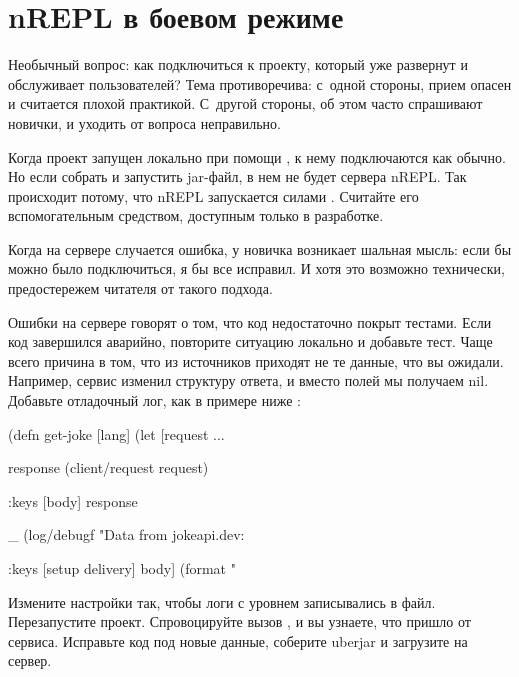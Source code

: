 \section{nREPL в боевом режиме}


Необычный вопрос: как подключиться к проекту, который уже развернут и обслуживает пользователей? Тема противоречива: с~одной стороны, прием опасен и считается плохой практикой. С~другой стороны, об этом часто спрашивают новички, и уходить от вопроса неправильно.

Когда проект запущен локально при помощи , к нему подключаются как обычно. Но если собрать и запустить jar-файл, в нем не будет сервера nREPL. Так происходит потому, что nREPL запускается силами . Считайте его вспомогательным средством, доступным только в разработке.

Когда на сервере случается ошибка, у новичка возникает шальная мысль: если бы можно было подключиться, я бы все исправил. И хотя это возможно технически, предостережем читателя от такого подхода.

Ошибки на сервере говорят о том, что код недостаточно покрыт тестами. Если код завершился аварийно, повторите ситуацию локально и добавьте тест. Чаще всего причина в том, что из источников приходят не те данные, что вы ожидали. Например, сервис  изменил структуру ответа, и вместо полей мы получаем nil. Добавьте отладочный лог, как в примере ниже :

\begin{english}
  \begin{clojure/lines}
(defn get-joke [lang]
  (let [request
        {...}

        response
        (client/request request)

        {:keys [body]}
        response

        _ (log/debugf "Data from jokeapi.dev: %

        {:keys [setup delivery]}
        body]
    (format "%
  \end{clojure/lines}
\end{english}

Измените настройки так, чтобы логи с уровнем  записывались в файл. Перезапустите проект. Спровоцируйте вызов , и вы узнаете, что пришло от сервиса. Исправьте код под новые данные, соберите uberjar и загрузите на сервер.

